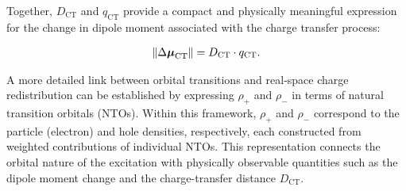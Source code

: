 Together, $D_\mathrm{CT}$ and $q_\mathrm{CT}$ provide a compact and physically
meaningful expression for the change in dipole moment associated with the
charge transfer process:

\begin{align}
  \norm{\Delta\boldsymbol{\mu}_\mathrm{CT}} = D_\mathrm{CT} \cdot q_{\mathrm{CT}}.
  \label{mu_ct}
\end{align}


A more detailed link between orbital transitions and real-space charge
redistribution can be established by expressing $\rho_+$ and $\rho_-$ in terms
of natural transition orbitals (NTOs). Within this framework, $\rho_+$ and
$\rho_-$ correspond to the particle (electron) and hole densities, respectively,
each constructed from weighted contributions of individual NTOs. This
representation connects the orbital nature of the excitation with physically
observable quantities such as the dipole moment change and the charge-transfer
distance $D_\mathrm{CT}$.

